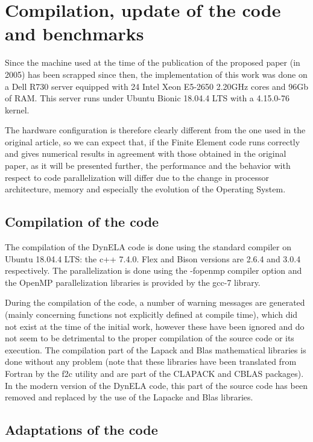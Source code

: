 \documentclass{article}
\begin{document}
\section{Compilation, update of the code and benchmarks}

Since the machine used at the time of the publication of the proposed paper (in 2005) has been scrapped since then, the implementation of this work was done on a Dell R730 server equipped with 24 Intel Xeon E5-2650 2.20GHz cores and 96Gb of RAM. This server runs under Ubuntu Bionic 18.04.4 LTS with a 4.15.0-76 kernel. 

The hardware configuration is therefore clearly different from the one used in the original article, so we can expect that, if the Finite Element code runs correctly and gives numerical results in agreement with those obtained in the original paper, as it will be presented further, the performance and the behavior with respect to code parallelization will differ due to the change in processor architecture, memory and especially the evolution of the Operating System.

\subsection{Compilation of the code}

The compilation of the DynELA code is done using the standard compiler on Ubuntu 18.04.4 LTS: the c++ 7.4.0. Flex and Bison versions are 2.6.4 and 3.0.4 respectively. The parallelization is done using the -fopenmp compiler option and the OpenMP parallelization libraries is provided by the gcc-7 library.

During the compilation of the code, a number of warning messages are generated (mainly concerning functions not explicitly defined at compile time), which did not exist at the time of the initial work, however these have been ignored and do not seem to be detrimental to the proper compilation of the source code or its execution. The compilation part of the Lapack and Blas mathematical libraries is done without any problem (note that these libraries have been translated from Fortran by the f2c utility and are part of the CLAPACK and CBLAS packages). In the modern version of the DynELA code, this part of the source code has been removed and replaced by the use of the Lapacke and Blas libraries.

\subsection{Adaptations of the code}
\end{document}
